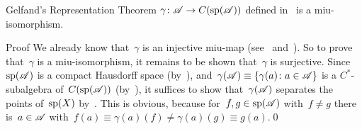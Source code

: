 \documentclass[main]{subfiles}
\begin{document}
\begin{parsec}
\begin{point}[gelfand]{Gelfand's Representation Theorem}
 $\gamma\colon \mathscr{A}\to C(\mathrm{sp}(\mathscr{A}))$
defined in~
is a miu-isomorphism.
\begin{point}{Proof}%
We already know that~$\gamma$ is an injective miu-map
(see~ 
and~).
So to prove that~$\gamma$ is a miu-isomorphism,
it remains to be shown that~$\gamma$ is surjective.
Since~$\mathrm{sp}(\mathscr{A})$ is a compact Hausdorff space 
(by~),
and~$\gamma(\mathscr{A})\equiv \{\gamma(a)\colon a\in \mathscr{A}\}$
is a $C^*$-subalgebra of~$C(\mathrm{sp}(\mathscr{A}))$
(by~),
it suffices to show that~$\gamma(\mathscr{A})$
separates the points of~$\mathrm{sp}(X)$
by~.
This is obvious,
because
for~$f,g\in \mathrm{sp}(\mathscr{A})$ with~$f\neq g$
there is~$a\in \mathscr{A}$ with~$f(a)\equiv \gamma(a)(f)
\neq \gamma(a)(g)\equiv g(a)$.\qed
\end{point}
\end{point}
\end{parsec}
\end{document}
